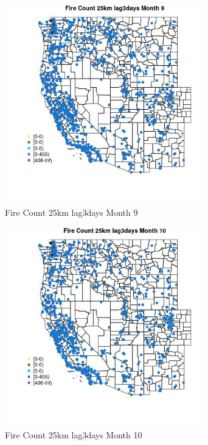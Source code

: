 \begin{figure} 
\centering  
\includegraphics[width=0.77\textwidth]{Code_Outputs/Report_ML_input_PM25_Step4_part_f_de_duplicated_aveswNAs_MapObsMo9Fire_Count_25km_lag3days.jpg} 
\caption{\label{fig:Report_ML_input_PM25_Step4_part_f_de_duplicated_aveswNAsMapObsMo9Fire_Count_25km_lag3days}Fire Count 25km lag3days Month 9} 
\end{figure} 
 

\begin{figure} 
\centering  
\includegraphics[width=0.77\textwidth]{Code_Outputs/Report_ML_input_PM25_Step4_part_f_de_duplicated_aveswNAs_MapObsMo10Fire_Count_25km_lag3days.jpg} 
\caption{\label{fig:Report_ML_input_PM25_Step4_part_f_de_duplicated_aveswNAsMapObsMo10Fire_Count_25km_lag3days}Fire Count 25km lag3days Month 10} 
\end{figure} 
 

